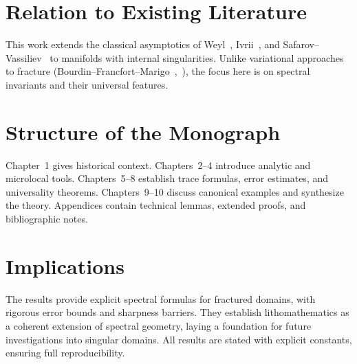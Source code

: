 \section*{Relation to Existing Literature}

This work extends the classical asymptotics of Weyl~\cite{weyl1911}, 
Ivrii~\cite{ivrii1980}, and Safarov–Vassiliev~\cite{safarov1997} 
to manifolds with internal singularities. 
Unlike variational approaches to fracture 
(Bourdin–Francfort–Marigo~\cite{bourdin2008},~\cite{bourdin2012}), 
the focus here is on spectral invariants and their universal features.

\section*{Structure of the Monograph}

Chapter~1 gives historical context.  
Chapters~2–4 introduce analytic and microlocal tools.  
Chapters~5–8 establish trace formulas, error estimates, and universality theorems.  
Chapters~9–10 discuss canonical examples and synthesize the theory.  
Appendices contain technical lemmas, extended proofs, and bibliographic notes.

\section*{Implications}

The results provide explicit spectral formulas for fractured domains, 
with rigorous error bounds and sharpness barriers. 
They establish lithomathematics as a coherent extension of spectral geometry, 
laying a foundation for future investigations into singular domains. 
All results are stated with explicit constants, ensuring full reproducibility.
